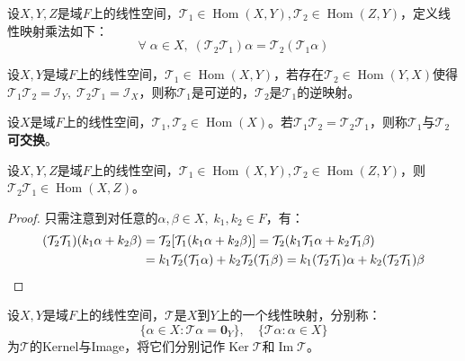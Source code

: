 \begin{definition}
	设$X,Y,Z$是域$F$上的线性空间，$\mathcal{T}_1\in\operatorname{Hom}(X,Y),\mathcal{T}_2\in\operatorname{Hom}(Z,Y)$，定义线性映射乘法如下：
	\begin{equation*}
		\forall\;\alpha\in X,\;(\mathcal{T}_2\mathcal{T}_1)\alpha=\mathcal{T}_2(\mathcal{T}_1\alpha)
	\end{equation*}
\end{definition}
\begin{definition}
	设$X,Y$是域$F$上的线性空间，$\mathcal{T}_1\in\operatorname{Hom}(X,Y)$，若存在$\mathcal{T}_2\in\operatorname{Hom}(Y,X)$使得$\mathcal{T}_1\mathcal{T}_2=\mathcal{I}_Y,\;\mathcal{T}_2\mathcal{T}_1=\mathcal{I}_X$，则称$\mathcal{T}_1$是可逆的，$\mathcal{T}_2$是$\mathcal{T}_1$的逆映射。
\end{definition}
\begin{definition}
	设$X$是域$F$上的线性空间，$\mathcal{T}_1,\mathcal{T}_2\in\operatorname{Hom}(X)$。若$\mathcal{T}_1\mathcal{T}_2=\mathcal{T}_2\mathcal{T}_1$，则称$\mathcal{T}_1$与$\mathcal{T}_2$\textbf{可交换}。
\end{definition}
\begin{theorem}
	设$X,Y,Z$是域$F$上的线性空间，$\mathcal{T}_1\in\operatorname{Hom}(X,Y),\mathcal{T}_2\in\operatorname{Hom}(Z,Y)$，则$\mathcal{T}_2\mathcal{T}_1\in\operatorname{Hom}(X,Z)$。
\end{theorem}
\begin{proof}
	只需注意到对任意的$\alpha,\beta\in X,\;k_1,k_2\in F$，有：
	\begin{align*}
		(\mathcal{T}_2\mathcal{T}_1)(k_1\alpha+k_2\beta)
		&=\mathcal{T}_2[\mathcal{T}_1(k_1\alpha+k_2\beta)]
		=\mathcal{T}_2(k_1\mathcal{T}_1\alpha+k_2\mathcal{T}_1\beta) \\
		&=k_1\mathcal{T}_2(\mathcal{T}_1\alpha)+k_2\mathcal{T}_2(\mathcal{T}_1\beta)
		=k_1(\mathcal{T}_2\mathcal{T}_1)\alpha+k_2(\mathcal{T}_2\mathcal{T}_1)\beta\qedhere
	\end{align*}
\end{proof}
\begin{definition}
	设$X,Y$是域$F$上的线性空间，$\mathcal{T}$是$X$到$Y$上的一个线性映射，分别称：
	\begin{equation*}
		\{\alpha\in X:\mathcal{T}\alpha=\mathbf{0}_Y\},\quad
		\{\mathcal{T}\alpha:\alpha\in X\}
	\end{equation*}
	为$\mathcal{T}$的\gls{Kernel}与\gls{Image}，将它们分别记作$\operatorname{Ker}\mathcal{T}$和$\operatorname{Im}\mathcal{T}$。
\end{definition}

